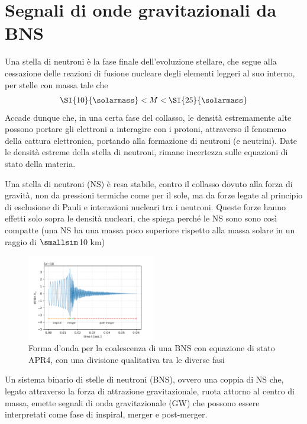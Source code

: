 \chapter[Segnali di GW da BNS]{Segnali di onde gravitazionali da BNS}
\label{chapter:segnaleGWdaBNS}
Una stella di neutroni è la fase finale dell'evoluzione stellare, che segue alla cessazione delle reazioni di fusione nucleare degli elementi leggeri al suo interno, per stelle con massa tale che
\begin{equation}
   	\SI{10}{\solarmass} < M < \SI{25}{\solarmass}
   	\label{eqn:massNS}
\end{equation}
Accade dunque che, in una certa fase del collasso, le densità estremamente alte possono portare gli elettroni a interagire con i protoni, attraverso il fenomeno della cattura elettronica, portando alla formazione di neutroni (e neutrini). Date le densità estreme della stella di neutroni, rimane incertezza sulle equazioni di stato della materia.\cite{hobson2006general}

Una stella di neutroni (NS) è resa stabile, contro il collasso dovuto alla forza di gravità, non da pressioni termiche come per il sole, ma da forze legate al principio di esclusione di Pauli e interazioni nucleari tra i neutroni. Queste forze hanno effetti solo sopra le densità nucleari, che spiega perché le NS sono sono così compatte (una NS ha una massa poco superiore rispetto alla massa solare in un raggio di $\smallsim$10 km)\cite{hartle2003gravity}
\begin{figure}
	\vspace{-15pt}
	\begin{center}
		\includegraphics[width=0.5\textwidth]{figures/Capitolo_1/APR4.pdf}
	\end{center}
	\vspace{-10pt}
	\caption{Forma d'onda per la coalescenza di una BNS con equazione di stato APR4, con una divisione qualitativa tra le diverse fasi}
	\label{fig:forma_onda_APR4}
	\vspace{-10pt}
\end{figure}
Un sistema binario di stelle di neutroni (BNS), ovvero una coppia di NS che, legato attraverso la forza di attrazione gravitazionale, ruota attorno al centro di massa, emette segnali di onda gravitazionale (GW) che possono essere interpretati come fase di inspiral, merger e post-merger.

